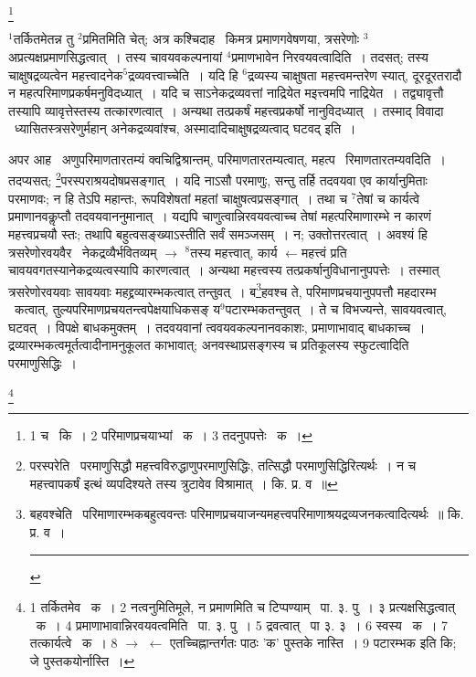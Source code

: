 \documentclass[11pt, openany]{book}
\newcommand\blfootnote[1]{%
 \begingroup
 \renewcommand\thefootnote{}\footnote{#1}%
 \addtocounter{footnote}{-1}%
 \endgroup
}
\begin{document}
\blfootnote{1 च  \textendash\ कि~। 2 परिमाणप्रचयाभ्यां  \textendash\ क~। 3 तदनुपपत्तेः  \textendash\ क~।}

\newpage
${}^1$तर्कितमेतन्न तु ${}^2$प्रमितमिति चेत्; अत्र कश्चिदाह \textendash\ किमत्र प्रमाणगवेषणया, त्रसरेणोः ${}^3$अप्रत्यक्षप्रमाणसिद्धत्वात्~। तस्य चावयवकल्पनायां ${}^4$प्रमाणभावेन निरवयवत्वादिति~। तदसत्; तस्य चाक्षुषद्रव्यत्वेन महत्त्वादनेक$^5$द्रव्यवत्त्वाच्चेति~। यदि हि ${}^6$द्रव्यस्य चाक्षुषता महत्त्वमन्तरेण स्यात्, दूरदूरतरादौ न महत्परिमाणप्रकर्षमनुविदध्यात्~। यदि च साऽनेकद्रव्यवत्तां नाद्रियेत मइत्त्वमपि नाद्रियेत~। तद्व्यावृत्तौ तस्यापि व्यावृत्तेस्तस्य तत्कारणत्वात्~। अन्यथा तत्प्रकर्षं महत्त्वप्रकर्षो नानुविदध्यात्~। तस्माद् विवादा \textendash\ ध्यासितस्त्रसरेणुर्महान् अनेकद्रव्यवांश्च, अस्मादादिचाक्षुषद्रव्यत्वाद् घटवद् इति~। 

अपर आह \textendash\ अणुपरिमाणतारतम्यं क्वचिद्विश्रान्तम्, परिमाणतारतम्यत्वात्, महत्प \textendash\ रिमाणतारतम्यवदिति~। तदप्यसत्; \renewcommand{\thefootnote}{१}\footnote{परस्परेति \textendash\ परमाणुसिद्धौ महत्त्वविरुद्धाणुपरमाणुसिद्धिः, तत्सिद्धौ परमाणुसिद्धिरित्यर्थः~। न च महत्त्वापकर्षं इत्थं व्यपदिश्यते तस्य त्रुटावेव विश्रामात्~। कि. प्र. व~॥}परस्पराश्रयदोषप्रसङ्गात्~। यदि नाऽसौ परमाणुः, सन्तु तर्हि तदवयवा एव कार्यानुमिताः परमाणवः; न हि तेऽपि महान्तः, रूपविशेषतां महतां चाक्षुषत्वप्रसङ्गात्~। तथा च ${}^7$तेषां च कार्यत्वे प्रमाणानवकॢप्तौ तदवयवाननुमानात्~। यद्यपि चाणुत्वान्निरवयवत्वाच्च तेषां महत्परिमाणारम्भे न कारणं महत्त्वप्रचयौ स्तः; तथापि बहुत्वसङ्ख्याऽस्तीति सर्वं समञ्जसम्~। न; उक्तोत्तरत्वात्~। अवश्यं हि त्रसरेणोरवयवैर \textendash\ नेकद्रव्यैर्भवितव्यम् $\rightarrow$ ${}^8$तस्य महत्त्वात्, कार्य $\leftarrow$महत्त्वं प्रति चावयवगतस्यानेकद्रव्यत्वस्यापि कारणत्वात्~। अन्यथा महत्त्वस्य तत्प्रकर्षानुविधानानुपपत्तेः~। तस्मात् त्रसरेणोरवयवाः सावयवाः महद्द्रव्यारम्भकत्वात् तन्तुवत्~। ब\renewcommand{\thefootnote}{२}\footnote{बहवश्चेति \textendash\ परिमाणारम्भकबहुत्ववन्तः परिमाणप्रचयाजन्यमहत्त्वपरिमाणाश्रयद्रव्यजनकत्वादित्यर्थः~॥ कि. प्र. व~।\\ \rule{0.4\linewidth}{0.5pt}}हवश्च ते, परिमाणप्रचयानुपपत्तौ महदारम्भ \textendash\ कत्वात्, तुल्यपरिमाणप्रचयतन्त्वपेक्षयाधिकसङ् य$^9$पटारम्भकतन्तुवत्~। ते च विभज्यन्ते, सावयवत्वात्, घटवत्~। विपक्षे बाधकमुक्तम्~। तदवयवानां त्ववयवकल्पनानवकाशः, प्रमाणाभावाद् बाधकाच्च~। द्रव्यारम्भकत्वमूर्तत्वादीनामनुकूलत काभावात्; अनवस्थाप्रसङ्गस्य च प्रतिकूलस्य स्फुटत्वादिति परमाणुसिद्धिः~। 

\blfootnote{1 तर्कितमेव  \textendash\ क~। 2 नत्वनुमितिमूले, न प्रमाणमिति च टिप्पण्याम्  \textendash\ पा. ३. पु~। ३ प्रत्यक्षसिद्धत्वात्  \textendash\ क~। 4 प्रमाणाभावान्निरवयवत्वमिति  \textendash\ पा. ३. पु~। 5 द्रवत्वात्  \textendash\ पा ३. ३~। 6 स्वस्य  \textendash\ क~। 7 तत्कार्यत्वे  \textendash\ क~। 8 $\rightarrow$ $\leftarrow$ एतच्चिह्नान्तर्गतः पाठः 'क' पुस्तके नास्ति~। 9 पटारम्भक इति कि; जे पुस्तकयोर्नास्ति~।}
\end{document}
